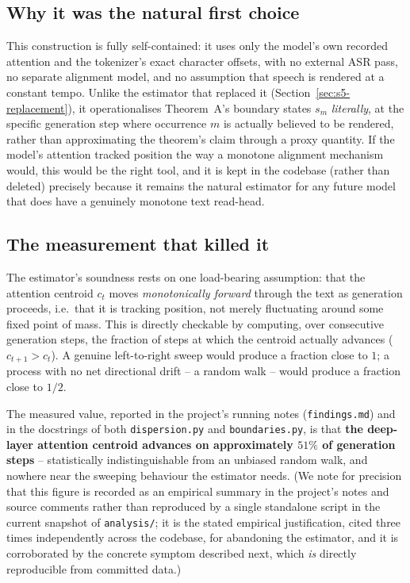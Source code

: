 \documentclass[11pt]{article}
\begin{document}
\subsection{Why it was the natural first choice}

This construction is fully self-contained: it uses only the model's own
recorded attention and the tokenizer's exact character offsets, with no
external ASR pass, no separate alignment model, and no assumption that speech
is rendered at a constant tempo. Unlike the estimator that replaced it
(Section~\ref{sec:s5-replacement}), it operationalises Theorem~A's boundary
states $s_m$ \emph{literally}, at the specific generation step where
occurrence $m$ is actually believed to be rendered, rather than approximating
the theorem's claim through a proxy quantity. If the model's attention
tracked position the way a monotone alignment mechanism would, this would be
the right tool, and it is kept in the codebase (rather than deleted) precisely
because it remains the natural estimator for any future model that does have
a genuinely monotone text read-head.

\subsection{The measurement that killed it}

The estimator's soundness rests on one load-bearing assumption: that the
attention centroid $c_t$ moves \emph{monotonically forward} through the text
as generation proceeds, i.e.\ that it is tracking position, not merely
fluctuating around some fixed point of mass. This is directly checkable by
computing, over consecutive generation steps, the fraction of steps at which
the centroid actually advances ($c_{t+1} > c_t$). A genuine left-to-right
sweep would produce a fraction close to $1$; a process with no net
directional drift -- a random walk -- would produce a fraction close to
$1/2$.

The measured value, reported in the project's running notes
(\texttt{findings.md}) and in the docstrings of both
\texttt{dispersion.py} and \texttt{boundaries.py}, is that \textbf{the
deep-layer attention centroid advances on approximately $51\%$ of generation
steps} -- statistically indistinguishable from an unbiased random walk, and
nowhere near the sweeping behaviour the estimator needs. (We note for
precision that this figure is recorded as an empirical summary in the
project's notes and source comments rather than reproduced by a single
standalone script in the current snapshot of \texttt{analysis/}; it is the
stated empirical justification, cited three times independently across the
codebase, for abandoning the estimator, and it is corroborated by the
concrete symptom described next, which \emph{is} directly reproducible from
committed data.)
\end{document}
